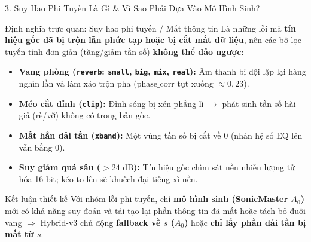 \documentclass[aspectratio=169,10pt]{beamer}
\begin{document}
\begin{frame}{3. Suy Hao Phi Tuyến Là Gì \& Vì Sao Phải Dựa Vào Mô Hình Sinh?}
  \footnotesize
  \begin{alertblock}{Định nghĩa trực quan: Suy hao phi tuyến / Mất thông tin}
    Là những lỗi mà \textbf{tín hiệu gốc đã bị trộn lẫn phức tạp hoặc bị cắt mất dữ liệu}, nên các bộ lọc tuyến tính đơn giản (tăng/giảm tần số) \textbf{không thể đảo ngược}:
    \begin{itemize}
      \item \textbf{Vang phòng (\texttt{reverb}: \texttt{small}, \texttt{big}, \texttt{mix}, \texttt{real}):} Âm thanh bị dội lặp lại hàng nghìn lần và làm xáo trộn pha ($\text{phase\_corr}$ tụt xuống $\approx 0{,}23$).
      \item \textbf{Méo cắt đỉnh (\texttt{clip}):} Đỉnh sóng bị xén phẳng lì $\rightarrow$ phát sinh tần số hài giả (rè/vỡ) không có trong bản gốc.
      \item \textbf{Mất hẳn dải tần (\texttt{xband}):} Một vùng tần số bị cắt về $0$ (nhân hệ số EQ lên vẫn bằng $0$).
      \item \textbf{Suy giảm quá sâu ($> 24\text{ dB}$):} Tín hiệu gốc chìm sát nền nhiễu lượng tử hóa 16-bit; kéo to lên sẽ khuếch đại tiếng xì nền.
    \end{itemize}
  \end{alertblock}
  \begin{block}{Kết luận thiết kế}
    Với nhóm lỗi phi tuyến, chỉ \textbf{mô hình sinh (SonicMaster $A_0$)} mới có khả năng suy đoán và tái tạo lại phần thông tin đã mất hoặc tách bỏ đuôi vang $\Rightarrow$ Hybrid-v3 chủ động \textbf{fallback về $s$ ($A_0$)} hoặc \textbf{chỉ lấy phần dải tần bị mất từ $s$}.
  \end{block}
\end{frame}
\end{document}
